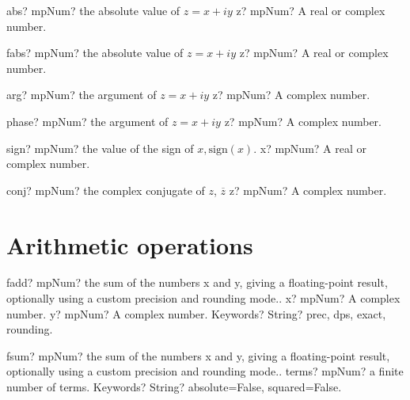 \documentclass[12pt,a4paper,openany]{book}
\begin{document}
\begin{mpFunctionsExtract}
\mpFunctionOne
{abs? mpNum? the absolute value of $z=x+iy$}
{z? mpNum? A real or complex number.}
\end{mpFunctionsExtract}

\begin{mpFunctionsExtract}
\mpFunctionOne
{fabs? mpNum? the absolute value of $z=x+iy$}
{z? mpNum? A real or complex number.}
\end{mpFunctionsExtract}

\begin{mpFunctionsExtract}
\mpFunctionOne
{arg? mpNum? the argument of $z=x+iy$}
{z? mpNum? A complex number.}
\end{mpFunctionsExtract}

\begin{mpFunctionsExtract}
\mpFunctionOne
{phase? mpNum? the argument of $z=x+iy$}
{z? mpNum? A complex number.}
\end{mpFunctionsExtract}

\begin{mpFunctionsExtract}
\mpFunctionOne
{sign? mpNum? the value of the sign of $x, \text{sign}(x)$.}
{x? mpNum? A real or complex number.}
\end{mpFunctionsExtract}

\begin{mpFunctionsExtract}
\mpFunctionOne
{conj? mpNum? the complex conjugate of $z$, $\overline{z}$}
{z? mpNum? A complex number.}
\end{mpFunctionsExtract}

\section{Arithmetic operations}

\begin{mpFunctionsExtract}
\mpFunctionThree
{fadd? mpNum? the sum of the numbers x and y, giving a floating-point result, optionally using a custom precision and rounding mode..}
{x? mpNum? A complex number.}
{y? mpNum? A complex number.}
{Keywords? String? prec, dps, exact, rounding.}
\end{mpFunctionsExtract}

\begin{mpFunctionsExtract}
\mpFunctionTwo
{fsum? mpNum? the sum of the numbers x and y, giving a floating-point result, optionally using a custom precision and rounding mode..}
{terms? mpNum? a finite number of terms.}
{Keywords? String? absolute=False, squared=False.}
\end{mpFunctionsExtract}
\end{document}
